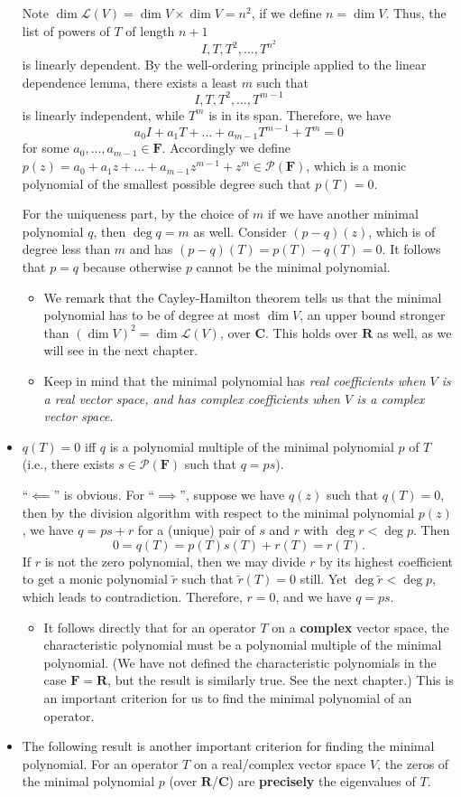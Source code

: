\documentclass{article}
\newcommand{\R}{\mathbf{R}}
\newcommand{\C}{\mathbf{C}}
\newcommand{\F}{\mathbf{F}}
\renewcommand{\d}{\dim}
\newcommand{\LV}{\mathcal{L}(V)}
\newcommand{\PF}{\mathcal{P}(\F)}
\begin{document}
\begin{itemize}
    Note $\d \LV = \d V \times \d V = n^2$, if we define $n = \d V$. Thus, the list of powers of $T$ of length $n+1$ \[I, T, T^2,\dots,T^{n^2}\] is linearly dependent. By the well-ordering principle applied to the linear dependence lemma, there exists a least $m$ such that \[I,T,T^2,\dots,T^{m-1}\] is linearly independent, while $T^m$ is in its span. Therefore, we have \[a_0 I + a_1 T + \dots + a_{m-1} T^{m-1} + T^m = 0\] for some $a_0,\dots,a_{m-1} \in \F$. Accordingly we define $p(z) = a_0 + a_1 z +\dots+ a_{m-1}z^{m-1} + z^m \in \PF$, which is a monic polynomial of the smallest possible degree such that $p(T) = 0$.

    For the uniqueness part, by the choice of $m$ if we have another minimal polynomial $q$, then $\deg q = m$ as well. Consider $(p-q)(z)$, which is of degree less than $m$ and has $(p-q)(T) = p(T) - q(T) = 0$. It follows that $p = q$ because otherwise $p$ cannot be the minimal polynomial.
    \begin{itemize}
        \item We remark that the Cayley-Hamilton theorem tells us that the minimal polynomial has to be of degree at most $\d V$, an upper bound stronger than $(\d V)^2 = \d \LV$, over $\C$. This holds over $\R$ as well, as we will see in the next chapter.
        \item Keep in mind that the minimal polynomial has \emph{real coefficients when $V$ is a real vector space, and has complex coefficients when $V$ is a complex vector space}.
    \end{itemize}
    \item $q(T) = 0$ iff $q$ is a polynomial multiple of the minimal polynomial $p$ of $T$ (i.e., there exists $s \in \PF$ such that $q=ps$).

    ``$\impliedby$'' is obvious. For ``$\implies$'', suppose we have $q(z)$ such that $q(T) = 0$, then by the division algorithm with respect to the minimal polynomial $p(z)$, we have $q = ps+r$ for a (unique) pair of $s$ and $r$ with $\deg r < \deg p$. Then \[0 = q(T) = p(T)s(T)+r(T) = r(T).\] If $r$ is not the zero polynomial, then we may divide $r$ by its highest coefficient to get a monic polynomial $\tilde{r}$ such that $\tilde{r}(T) = 0$ still. Yet $\deg \tilde{r} < \deg p$, which leads to contradiction. Therefore, $r = 0$, and we have $q = ps$.
    \begin{itemize}
        \item It follows directly that for an operator $T$ on a \textbf{complex} vector space, the characteristic polynomial must be a polynomial multiple of the minimal polynomial. (We have not defined the characteristic polynomials in the case $\F = \R$, but the result is similarly true. See the next chapter.) This is an important criterion for us to find the minimal polynomial of an operator.
    \end{itemize}
    \item The following result is another important criterion for finding the minimal polynomial. For an operator $T$ on a real/complex vector space $V$, the zeros of the minimal polynomial $p$ (over $\R$/$\C$) are \textbf{precisely} the eigenvalues of $T$.


\end{itemize}
\end{document}
